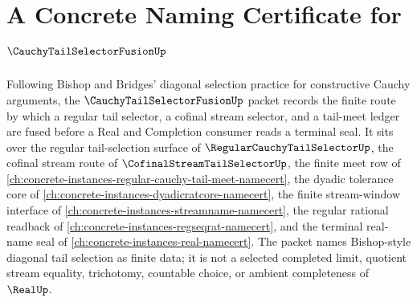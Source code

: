 \chapter{A Concrete Naming Certificate for $\CauchyTailSelectorFusionUp$}
\label{ch:concrete-instances-cauchy-tail-selector-fusion-namecert}

Following Bishop and Bridges' diagonal selection practice for constructive Cauchy arguments, the $\CauchyTailSelectorFusionUp$ packet records the finite route by which a regular tail selector, a cofinal stream selector, and a tail-meet ledger are fused before a Real and Completion consumer reads a terminal seal. It sits over the regular tail-selection surface of $\RegularCauchyTailSelectorUp$, the cofinal stream route of $\CofinalStreamTailSelectorUp$, the finite meet row of \autoref{ch:concrete-instances-regular-cauchy-tail-meet-namecert}, the dyadic tolerance core of \autoref{ch:concrete-instances-dyadicratcore-namecert}, the finite stream-window interface of \autoref{ch:concrete-instances-streamname-namecert}, the regular rational readback of \autoref{ch:concrete-instances-regseqrat-namecert}, and the terminal real-name seal of \autoref{ch:concrete-instances-real-namecert}. The packet names Bishop-style diagonal tail selection as finite data; it is not a selected completed limit, quotient stream equality, trichotomy, countable choice, or ambient completeness of $\RealUp$.

